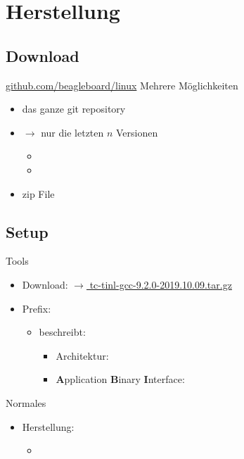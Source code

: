 \section{Herstellung}

\subsection{Download}
\begin{frame}{\url{github.com/beagleboard/linux}}
             {Mehrere Möglichkeiten}
 \begin{itemize}
  \item das ganze git repository
  \item {$\to$ \Large nur die letzten $n$ Versionen }
  \begin{itemize}
   \item {}
   \item {}
  \end{itemize}
  \item zip File 
 \end{itemize}
\end{frame}

\subsection{Setup}
\begin{frame}{Tools}%
 \begin{description}[toolchain]
 
  \item[toolchain] 
   \begin{itemize}
    \item 
    Download: \href{https://drive.switch.ch/index.php/s/6Hmx59Dz9rm6p2n}
         {$\to$ tc-tinl-gcc-9.2.0-2019.10.09.tar.gz}
    
   \item Prefix: 
    \begin{itemize}
     \item beschreibt:
     \begin{itemize}
      \item Architektur: 
      \item {\bf A}pplication {\bf B}inary {\bf I}nterface: 
     \end{itemize}
    \end{itemize}
    \end{itemize}
  \item[make] Normales 
  \begin{itemize}
   \item {} Herstellung:
   \begin{itemize}
    \item {}
   \end{itemize}
  \end{itemize}
 \end{description}
\end{frame}

